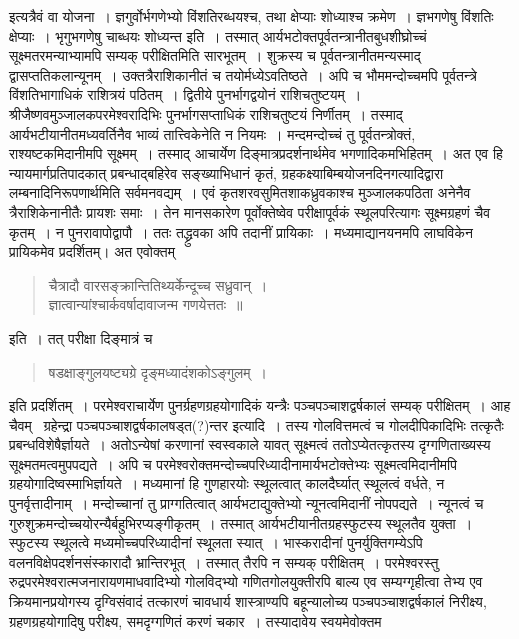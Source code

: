 \documentclass[11pt, openany]{book}
\begin{document}
\noindent इत्यत्रैवं वा योजना~। ज्ञगुर्वोर्भगणेभ्यो विंशतिरब्धयश्च, तथा क्षेप्याः शोध्याश्च क्रमेण~। ज्ञभगणेषु विंशतिः क्षेप्याः~। भृगुभगणेषु चाब्धयः शोध्यन्त इति~। तस्मात् आर्यभटोक्तपूर्वतन्त्रानीतबुधशीघ्रोच्चं सूक्ष्मतरमन्याभ्यामपि सम्यक् परीक्षितमिति सारभूतम्~। शुक्रस्य च पूर्वतन्त्रानीतमन्यस्माद् द्वासप्ततिकलान्यूनम्~। उक्तत्रैराशिकानीतं च तयोर्मध्येऽवतिष्ठते~। अपि च भौममन्दोच्चमपि पूर्वतन्त्रे विंशतिभागाधिकं
राशित्रयं पठितम्~। द्वितीये पुनर्भागद्वयोनं राशिचतुष्टयम्~। श्रीजैष्णवमुञ्जालकपरमेश्वरादिभिः पुनर्भागसप्ताधिकं राशिचतुष्टयं निर्णीतम्~।
तस्माद् आर्यभटीयानीतमध्यवर्तिनैव भाव्यं तात्त्विकेनेति न नियमः~। मन्दमन्दोच्चं तु पूर्वतन्त्रोक्तं, राश्यष्टकमिदानीमपि सूक्ष्मम्~। तस्माद्
आचार्येण दिङ्मात्रप्रदर्शनार्थमेव भगणादिकमभिहितम्~। अत एव हि न्यायमार्गप्रतिपादकात् प्रबन्धाद्बहिरेव सङ्ख्याभिधानं कृतं,
ग्रहकक्ष्याबिम्बयोजनदिनगत्यादिद्वारा लम्बनादिनिरूपणार्थमिति सर्वमनवद्यम्~। एवं कृतशरवसुमितशाकध्रुवकाश्च मुञ्जालकपठिता अनेनैव त्रैराशिकेनानीतैः प्रायशः समाः~। तेन मानसकारेण पूर्वोक्तेष्वेव परीक्षापूर्वकं स्थूलपरित्यागः सूक्ष्मग्रहणं चैव कृतम्~। न पुनरावापोद्वापौ~। ततः
तद्ध्रुवका अपि तदानीं प्रायिकाः~। मध्यमाद्यानयनमपि लाघविकेन प्रायिकमेव प्रदर्शितम्। अत एवोक्तम्\textendash 

\begin{quote}
{\qt चैत्रादौ वारसङ्क्रान्तितिथ्यर्केन्दूच्च सध्रुवान्~।\\
ज्ञात्वान्यांश्चार्कवर्षादावाजन्म गणयेत्ततः~॥}
	\end{quote}
	
\noindent इति~। तत् परीक्षा दिङ्मात्रं च\textendash 

\begin{quote}
{\qt षडक्षाङ्गुलयष्ट्यग्रे दृङ्मध्यादंशकोऽङ्गुलम्~।}
\end{quote}

\newpage

\noindent इति प्रदर्शितम्~। परमेश्वराचार्येण पुनर्ग्रहणग्रहयोगादिकं यन्त्रैः पञ्चपञ्चाशद्वर्षकालं सम्यक् परीक्षितम्~। आह चैवम् \textendash\ {\qt ग्रहेन्द्रा
पञ्चपञ्चाशद्वर्षकालषड्त(?)न्तर} इत्यादि~। तस्य गोलवित्तमत्वं च गोलदीपिकादिभिः तत्कृतैः प्रबन्धविशेषैर्ज्ञायते~। अतोऽन्येषां करणानां स्वस्वकाले यावत् सूक्ष्मत्वं ततोऽप्येतत्कृतस्य दृग्गणिताख्यस्य सूक्ष्मतमत्वमुपपद्यते~। अपि च परमेश्वरोक्तमन्दोच्चपरिध्यादीनामार्यभटोक्तेभ्यः सूक्ष्मत्वमिदानीमपि ग्रहयोगादिष्वस्माभिर्ज्ञायते~। मध्यमानां हि गुणहारयोः स्थूलत्वात् कालदैर्घ्यात् स्थूलत्वं वर्धते, न पुनर्वृत्तादीनाम्~। मन्दोच्चानां तु प्राग्गतित्वात् आर्यभटाद्युक्तेभ्यो न्यूनत्वमिदानीं नोपपद्यते~। न्यूनत्वं च गुरुशुक्रमन्दोच्चयोरन्यैर्बहुभिरप्यङ्गीकृतम्~। तस्मात् आर्यभटीयानीतग्रहस्फुटस्य स्थूलतैव युक्ता~। स्फुटस्य स्थूलत्वे मध्यमोच्चपरिध्यादीनां स्थूलता स्यात्~। भास्करादीनां पुनर्युक्तिगम्येऽपि वलनविक्षेपदर्शनसंस्कारादौ भ्रान्तिरभूत्~। तस्मात् तैरपि न सम्यक् परीक्षितम्~। परमेश्वरस्तु रुद्रपरमेश्वरात्मजनारायणमाधवादिभ्यो गोलविद्भ्यो गणितगोलयुक्तीरपि बाल्य एव सम्यग्गृहीत्वा तेभ्य एव क्रियमानप्रयोगस्य दृग्विसंवादं तत्कारणं चावधार्य शास्त्राण्यपि बहून्यालोच्य पञ्चपञ्चाशद्वर्षकालं निरीक्ष्य, ग्रहणग्रहयोगादिषु परीक्ष्य, समदृग्गणितं करणं चकार~। तस्यादावेय स्वयमेवोक्तम\textendash 
\end{document}

